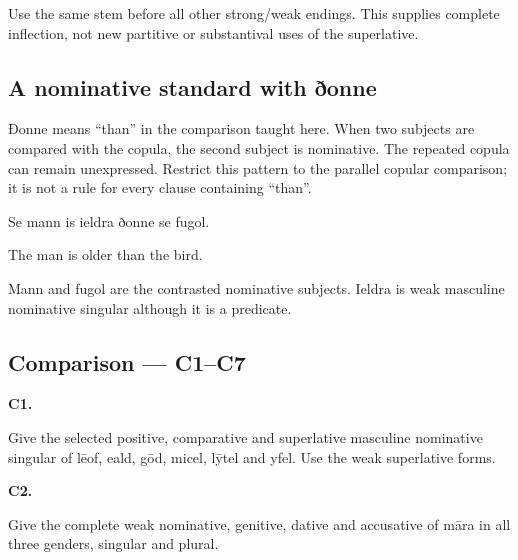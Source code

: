 Use the same stem before all other strong/\allowbreak{}weak endings. This supplies complete inflection, not new partitive or substantival uses of the superlative.

\subsection*{A nominative standard with ðonne}

Ðonne means “than” in the comparison taught here. When two subjects are compared with the copula, the second subject is nominative. The repeated copula can remain unexpressed. Restrict this pattern to the parallel copular comparison; it is not a rule for every clause containing “than”.

Se mann is ieldra ðonne se fugol.

The man is older than the bird.

Mann and fugol are the contrasted nominative subjects. Ieldra is weak masculine nominative singular although it is a predicate.

\subsection*{Comparison — C1–C7}

\par\begin{minipage}{\linewidth}\raggedright
\textbf{C1.}

Give the selected positive, comparative and superlative masculine nominative singular of lēof, eald, gōd, micel, lȳtel and yfel. Use the weak superlative forms.

\end{minipage}\par\addvspace{4pt}

\par\begin{minipage}{\linewidth}\raggedright
\textbf{C2.}

Give the complete weak nominative, genitive, dative and accusative of māra in all three genders, singular and plural.

\end{minipage}\par\addvspace{4pt}

